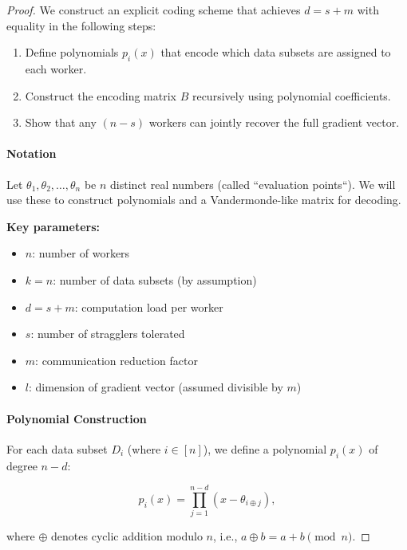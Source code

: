 \documentclass{report}
\theoremstyle{definition}
\begin{document}
\begin{proof}
    \noindent We construct an explicit coding scheme that achieves $d = s + m$ with equality in the following steps:
    \begin{enumerate}
        \item Define polynomials $p_i(x)$ that encode which data subsets are assigned to each worker.
        \item Construct the encoding matrix $B$ recursively using polynomial coefficients.
        \item Show that any $(n-s)$ workers can jointly recover the full gradient vector.
    \end{enumerate}

    \paragraph{Notation}
    Let $\theta_1, \theta_2, \ldots, \theta_n$ be $n$ distinct real numbers (called ``evaluation points``). We will use these to construct polynomials and a Vandermonde-like matrix for decoding.

    \noindent \textbf{Key parameters:}
    \begin{itemize}
        \item $n$: number of workers
        \item $k = n$: number of data subsets (by assumption)
        \item $d = s + m$: computation load per worker
        \item $s$: number of stragglers tolerated
        \item $m$: communication reduction factor
        \item $l$: dimension of gradient vector (assumed divisible by $m$)
    \end{itemize}

    \paragraph{Polynomial Construction}
    For each data subset $D_i$ (where $i \in [n]$), we define a polynomial $p_i(x)$ of degree $n - d$:

    \begin{equation}
        p_i(x) = \prod_{j=1}^{n-d} (x - \theta_{i \oplus j}),
    \end{equation}

    \noindent where $\oplus$ denotes cyclic addition modulo $n$, i.e., $a \oplus b = a + b \pmod{n}$.


\end{proof}
\end{document}
